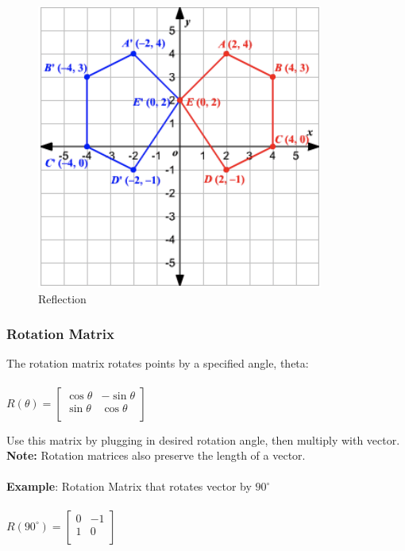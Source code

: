 \documentclass{beamer}
\begin{document}
\begin{frame}[t]
\begin{figure}[!tbp]
\begin{minipage}[b]{0.3\textwidth}
    \includegraphics[width=\textwidth]{./images/reflection.png}
    \caption{Reflection}
  \end{minipage}
\end{figure}
\end{frame}



\begin{frame}[t]\vspace{10pt}
\frametitle{Rotation Matrix}
The rotation matrix rotates points by a specified angle, theta: \\~\\
$R(\theta) = \begin{bmatrix}
\cos{\theta} & -\sin{\theta} \\
\sin{\theta} & \cos{\theta} \\
\end{bmatrix}$

Use this matrix by plugging in desired rotation angle, then multiply with vector. \\
\textbf{Note: } Rotation matrices also preserve the length of a vector. \\~\\
\textbf{Example}: Rotation Matrix that rotates vector by $90^{\circ}$ \\~\\
$R(90^{\circ}) = \begin{bmatrix}
0 & -1 \\
1 & 0 \\
\end{bmatrix}$
\end{frame}
\end{document}
